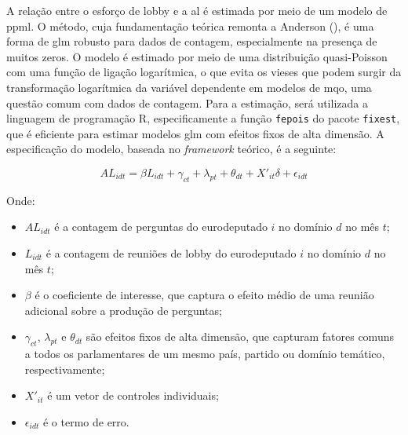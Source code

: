 A relação entre o esforço de lobby e a \acrshort{al} é estimada por meio de um modelo de \acrfull{ppml}. O método, cuja fundamentação teórica remonta a Anderson (\citeyear{anderson1979theoretical}), é uma forma de \acrfull{glm} robusto para dados de contagem, especialmente na presença de muitos zeros. O modelo é estimado por meio de uma distribuição quasi-Poisson com uma função de ligação logarítmica, o que evita os vieses que podem surgir da transformação logarítmica da variável dependente em modelos de \acrfull{mqo}, uma questão comum com dados de contagem. Para a estimação, será utilizada a linguagem de programação R, especificamente a função \texttt{fepois} do pacote \texttt{fixest}, que é eficiente para estimar modelos \acrshort{glm} com efeitos fixos de alta dimensão. A especificação do modelo, baseada no \textit{framework} teórico, é a seguinte:

\begin{equation}
    \label{eq:modelo_final}
    AL_{idt} = \beta L_{idt} + \gamma_{ct} + \lambda_{pt} + \theta_{dt} + X'_{it}\delta + \epsilon_{idt}
\end{equation}

Onde:
\begin{itemize}
    \item $AL_{idt}$ é a contagem de perguntas do eurodeputado $i$ no domínio $d$ no mês $t$;
    \item $L_{idt}$ é a contagem de reuniões de lobby do eurodeputado $i$ no domínio $d$ no mês $t$;
    \item $\beta$ é o coeficiente de interesse, que captura o efeito médio de uma reunião adicional sobre a produção de perguntas;
    \item $\gamma_{ct}$, $\lambda_{pt}$ e $\theta_{dt}$ são efeitos fixos de alta dimensão, que capturam fatores comuns a todos os parlamentares de um mesmo país, partido ou domínio temático, respectivamente;
    \item $X'_{it}$ é um vetor de controles individuais;
    \item $\epsilon_{idt}$ é o termo de erro.
\end{itemize}

